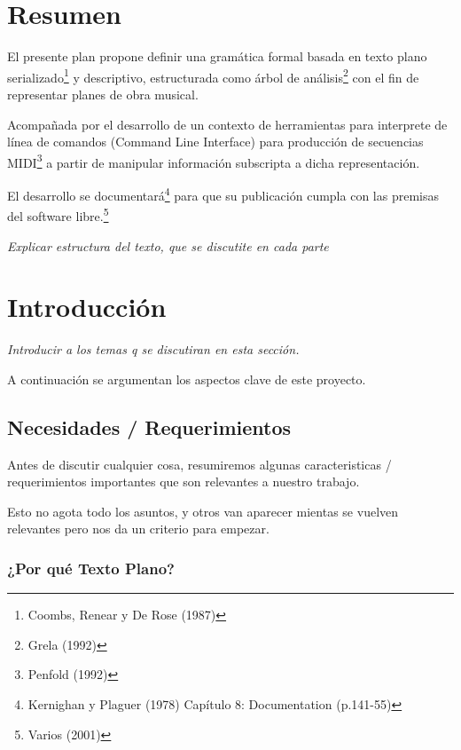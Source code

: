 \documentclass[]{article}
\begin{document}
\newpage

 {
      \setcounter{tocdepth}{4}
    
    \renewcommand{\contentsname}{Contendios}
    \tableofcontents
} 
\hypertarget{resumen}{%
\section{Resumen}\label{resumen}}

El presente plan propone definir una gramática formal basada en texto
plano serializado\footnote{Coombs, Renear y De Rose (1987)} y
descriptivo, estructurada como árbol de análisis\footnote{Grela (1992)}
con el fin de representar planes de obra musical.

Acompañada por el desarrollo de un contexto de herramientas para
interprete de línea de comandos (Command Line Interface) para producción
de secuencias MIDI\footnote{Penfold (1992)} a partir de manipular
información subscripta a dicha representación.

El desarrollo se documentará\footnote{Kernighan y Plaguer (1978)
  Capítulo 8: Documentation (p.141-55)} para que su publicación cumpla
con las premisas del software libre.\footnote{Varios (2001)}

\emph{Explicar estructura del texto, que se discutite en cada parte}

\newpage

\hypertarget{introducciuxf3n}{%
\section{Introducción}\label{introducciuxf3n}}

\emph{Introducir a los temas q se discutiran en esta sección.}

A continuación se argumentan los aspectos clave de este proyecto.

\hypertarget{necesidades-requerimientos}{%
\subsection{Necesidades /
Requerimientos}\label{necesidades-requerimientos}}

Antes de discutir cualquier cosa, resumiremos algunas caracteristicas /
requerimientos importantes que son relevantes a nuestro trabajo.

Esto no agota todo los asuntos, y otros van aparecer mientas se vuelven
relevantes pero nos da un criterio para empezar.

\hypertarget{por-quuxe9-texto-plano}{%
\subsubsection{¿Por qué Texto Plano?}\label{por-quuxe9-texto-plano}}
\end{document}
